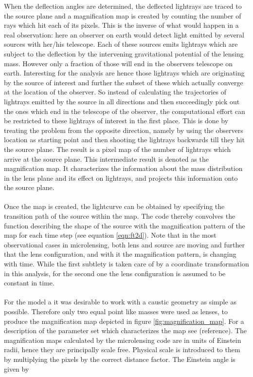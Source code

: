 When the deflection angles are determined, the deflected lightrays are traced to the source plane and a magnification map is created by counting the number of rays which hit each of its pixels. This is the inverse of what would happen in a real observation: here an observer on earth would detect light emitted by several sources with her/his telescope. Each of these sources emits lightrays which are subject to the deflection by the intervening gravitational potential of the lensing mass. However only a fraction of those will end in the observers telescope on earth. Interesting for the analysis are hence those lightrays which are originating by the source of interest and further the subset of these which actually converge at the location of the observer. So instead of calculating the trajectories of lightrays emitted by the source in all directions and then succeedingly pick out the ones which end in the telescope of the observer, the computational effort can be restricted to these lightrays of interest in the first place. This is done by treating the problem from the opposite direction, namely by using the observers location as starting point and then shooting the lightrays backwards till they hit the source plane. The result is a pixel map of the number of lightrays which arrive at the source plane. This intermediate result is denoted as the magnification map. It characterizes the information about the mass distribution in the lens plane and its effect on lightrays, and projects this information onto the source plane. \\\\
Once the map is created, the lightcurve can be obtained by specifying the transition path of the source within the map. The code thereby convolves the function describing the shape of the source with the magnification pattern of the map for each time step (see equation \ref{eqn:ft2d}). Note that in the most observational cases in microlensing, both lens and source are moving and further that the lens configuration, and with it the magnification pattern, is changing with time. While the first subtlety is taken care of by a coordinate transformation in this analysis, for the second one the lens configuration is assumed to be constant in time.  \\\\
For the model a it was desirable to work with a caustic geometry as simple as possible. Therefore only two equal point like masses were used as lenses, to produce the magnification map depicted in figure \ref{fig:magnification_map}. For a description of the parameter set which characterizes the map see (reference). The magnification maps calculated by the microlensing code are in units of Einstein radii, hence they are principally scale free. Physical scale is introduced to them by multiplying the pixels by the correct distance factor. The Einstein angle is given by   
